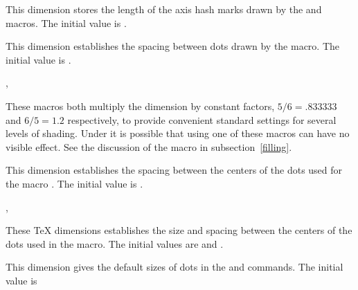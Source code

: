 \documentclass[letterpaper]{article}
\begin{document}
\begin{cd}
%
\end{cd}

This dimension stores the length of the axis hash marks drawn by the
 and  macros. The initial value is \dim{4pt}.

\begin{cd}
%
\end{cd}

This dimension establishes the spacing between dots drawn by the
 macro. The initial value is \dim{1pt}.

\begin{cd}
, %
%
\end{cd}

These macros both multiply the  dimension by constant
factors, $5/6=.833333$ and $6/5=1.2$ respectively, to provide convenient
standard settings for several levels of shading. Under \MF{} it is
possible that using one of these macros can have no visible effect. See
the discussion of the  macro in subsection~\ref{filling}.

\begin{cd}
%
\end{cd}

This dimension establishes the spacing between the centers of the dots
used for the macro . The initial value is \dim{10pt}.

\begin{cd}
, %
%
\end{cd}

These \TeX{} dimensions establishes the size and spacing between the
centers of the dots used in the  macro. The initial values
are \dim{0.5pt} and \dim{3pt}.

\begin{cd}
%
%
\end{cd}

This dimension gives the default sizes of dots in the  and
 commands. The initial value is \dim{0.5pt}
\end{document}
